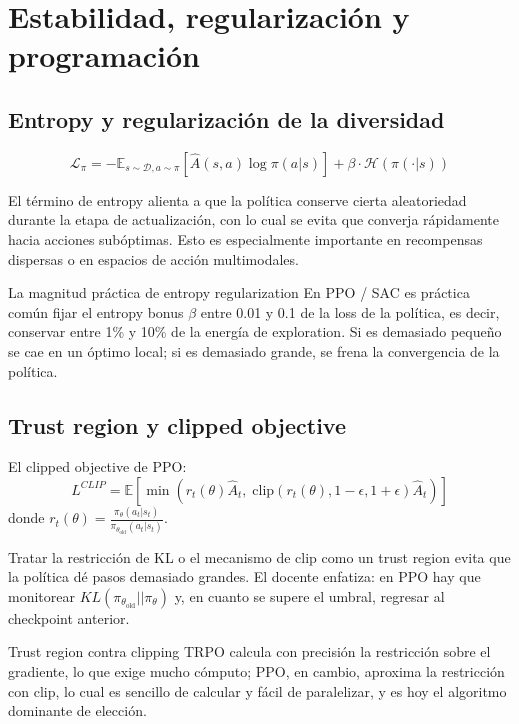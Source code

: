 \documentclass[a4paper]{article}
\begin{document}
\section{Estabilidad, regularización y programación}

\subsection{Entropy y regularización de la diversidad}

\begin{equation*}
\mathcal{L}_\pi = -\mathbb{E}_{s \sim \mathcal{D}, a \sim \pi} \left[\hat{A}(s,a)\log \pi(a|s)\right] + \beta \cdot \mathcal{H}(\pi(\cdot|s))
\end{equation*}

El término de entropy alienta a que la política conserve cierta aleatoriedad durante la etapa de actualización, con lo cual se evita que converja rápidamente hacia acciones subóptimas. Esto es especialmente importante en recompensas dispersas o en espacios de acción multimodales.

\begin{importantbox}{La magnitud práctica de entropy regularization}
En PPO / SAC es práctica común fijar el entropy bonus $\beta$ entre 0.01 y 0.1 de la loss de la política, es decir, conservar entre 1\% y 10\% de la energía de exploration. Si es demasiado pequeño se cae en un óptimo local; si es demasiado grande, se frena la convergencia de la política.
\end{importantbox}

\subsection{Trust region y clipped objective}

El clipped objective de PPO:
$${L}^{CLIP} = \mathbb{E} \left[ \min\left( r_t(\theta)\hat{A}_t, \; \text{clip}(r_t(\theta), 1-\epsilon, 1+\epsilon)\hat{A}_t \right) \right]$$
donde $r_t(\theta) = \frac{\pi_\theta(a_t|s_t)}{\pi_{\theta_{\text{old}}}(a_t|s_t)}$.

Tratar la restricción de KL o el mecanismo de clip como un trust region evita que la política dé pasos demasiado grandes. El docente enfatiza: en PPO hay que monitorear $KL(\pi_{\theta_{\text{old}}}||\pi_\theta)$ y, en cuanto se supere el umbral, regresar al checkpoint anterior.

\begin{knowledgebox}{Trust region contra clipping}
TRPO calcula con precisión la restricción sobre el gradiente, lo que exige mucho cómputo; PPO, en cambio, aproxima la restricción con clip, lo cual es sencillo de calcular y fácil de paralelizar, y es hoy el algoritmo dominante de elección.
\end{knowledgebox}
\end{document}
